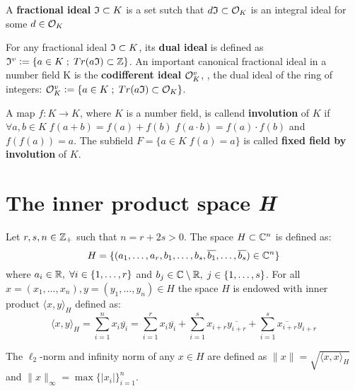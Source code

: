 \documentclass[Ingles]{ic-tese-v3}
\begin{document}
\begin{definition}
  A \textbf{fractional ideal} $\mathfrak{I} \subset K$ is a set sutch that $d\mathfrak{I} \subset \mathcal{O}_K$ is an
  integral ideal for some $d \in \mathcal{O}_K$
\end{definition}

\begin{definition}
  For any fractional ideal $\mathfrak{I} \subset K$, its \textbf{dual ideal} is defined as
  $\mathfrak{I}^v \vcentcolon = \{ a \in K \;;\; Tr(a\mathfrak{I}) \subset \mathbb{Z} \}$. An important canonical
  fractional ideal in a number field K is the \textbf{codifferent ideal}
  $\mathcal{O}_K^v$, \ie, the dual ideal of the ring of integers: $\mathcal{O}_K^v \vcentcolon = \{ a \in K \;;\; Tr(a\mathfrak{I}) \subset \mathcal{O}_K \}$.
\end{definition}

    \begin{definition}
\label{def:fixed-field-by-involution}
      A map $f: K \rightarrow K$, where $K$ is a number field, is callend \textbf{involution}
      of $K$ if $\forall a,b \in K \; f(a+b) = f(a) + f(b) \; f(a\cdot b) = f(a) \cdot f(b)$ and
      $f(f(a)) = a$. The subfield $F = \{a \in K \; f(a) = a\}$ is called \textbf{fixed field by
        involution} of $K$.
    \end{definition}
\section{The inner product space \emph{H}}
\label{sec:org2b27f5c}
\begin{definition}
  \label{def:h-space}
  Let $r,s,n \in \mathbb{Z}_+$ such that $n = r + 2s > 0$. The space $H \subset \mathbb{C}^n$ is defined
  as:
  \begin{equation*}
    H = \{(a_1,\dots, a_r, b_1,\dots, b_s, \overline{b_1}, \dots, \overline{b_s}) \in \mathbb{C}^n\}
  \end{equation*}
  where $a_i \in \mathbb{R}, \; \forall i \in \{1,\dots,r\}$ and $b_j \in \mathbb{C} \setminus \mathbb{R}, \; j \in \{1,\dots,
  s\}$. For all $x = \left(x_1, \dots, x_n\right), y = \left(y_1, \dots, y_n\right) \in H$ the space
  $H$ is endowed with inner product $\langle {x,y} \rangle_H$ defined as:
  \begin{equation*}
    \langle {x,y} \rangle_H = \sum_{i=1}^n{x_i \overline{y_i}} = \sum_{i=1}^r{x_i \overline{y_i}} + \sum_{i=1}^s{x_{i+r} \overline{y_{i+r}}} + \sum_{i=1}^s{\overline{x_{i+r}} y_{i+r}}
  \end{equation*}

  The $\ell_2$-norm and infinity norm of any $x \in H$ are defined as $\|x\| =
  \sqrt{\langle{x,x}\rangle_H}$ and $\|x\|_\infty = \max{\{ |x_i| \}}_{i=1}^n $.
\end{definition}
\end{document}
